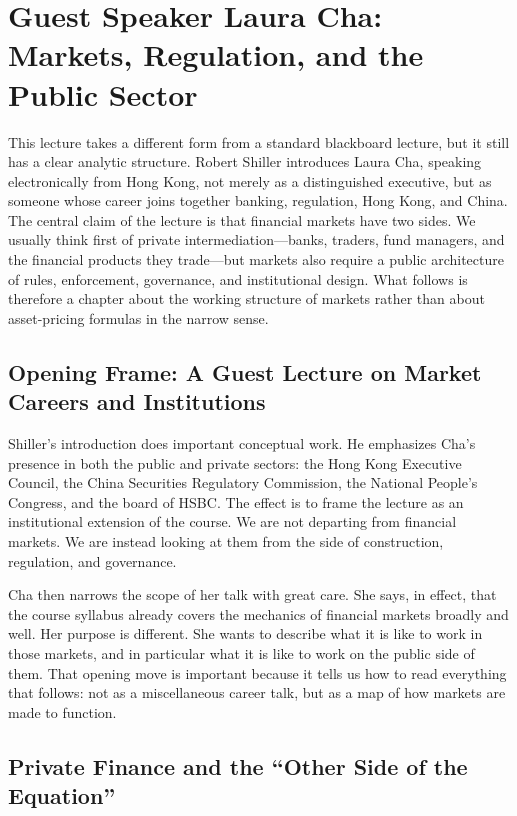\chapter{Guest Speaker Laura Cha: Markets, Regulation, and the Public Sector}

This lecture takes a different form from a standard blackboard lecture, but it still has a clear analytic structure. Robert Shiller introduces Laura Cha, speaking electronically from Hong Kong, not merely as a distinguished executive, but as someone whose career joins together banking, regulation, Hong Kong, and China. The central claim of the lecture is that financial markets have two sides. We usually think first of private intermediation---banks, traders, fund managers, and the financial products they trade---but markets also require a public architecture of rules, enforcement, governance, and institutional design. What follows is therefore a chapter about the working structure of markets rather than about asset-pricing formulas in the narrow sense.

\section{Opening Frame: A Guest Lecture on Market Careers and Institutions}

Shiller's introduction does important conceptual work. He emphasizes Cha's presence in both the public and private sectors: the Hong Kong Executive Council, the China Securities Regulatory Commission, the National People's Congress, and the board of HSBC. The effect is to frame the lecture as an institutional extension of the course. We are not departing from financial markets. We are instead looking at them from the side of construction, regulation, and governance.

Cha then narrows the scope of her talk with great care. She says, in effect, that the course syllabus already covers the mechanics of financial markets broadly and well. Her purpose is different. She wants to describe what it is like to work in those markets, and in particular what it is like to work on the public side of them. That opening move is important because it tells us how to read everything that follows: not as a miscellaneous career talk, but as a map of how markets are made to function.

\section{Private Finance and the ``Other Side of the Equation''}

